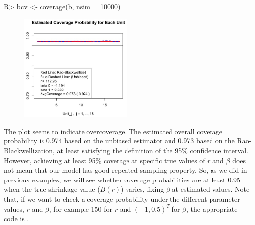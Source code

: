 \documentclass[article]{jss}
\begin{document}
\begin{CodeChunk}
\begin{CodeInput}
R> bcv <- coverage(b, nsim = 10000)
\end{CodeInput}
\end{CodeChunk}
\begin{figure}[h]
\begin{center}
\includegraphics[width = 5.5cm]{baseball2.png}
\end{center}
\end{figure}


The plot seems to indicate overcoverage. The estimated overall coverage probability is 0.974 based on the unbiased estimator and 0.973 based on the Rao-Blackwellization, at least satisfying the definition of the 95\% confidence interval. 
\\

However, achieving at least 95\% coverage at specific true values of $r$ and $\beta$ does not mean that our model has good repeated sampling property. So, as we did in previous examples, we will see whether coverage probabilities are at least 0.95 when the true shrinkage value ($B(r)$) varies, fixing $\beta$ at estimated values. Note that, if we want to check a coverage probability under the different parameter values, $r$ and $\beta$, for example 150 for $r$ and $(-1, 0.5)^{T}$ for $\beta$, the appropriate code is . 
\end{document}
